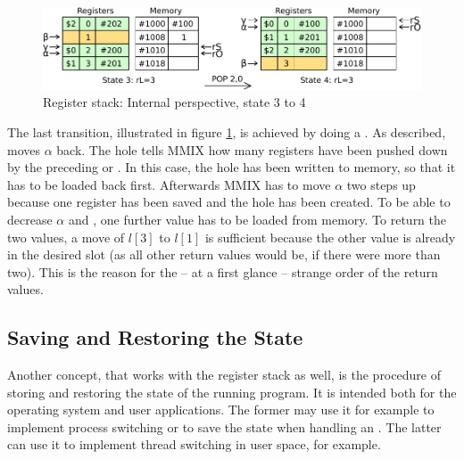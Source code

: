\begin{figure}[H]
	\centering
	\includegraphics[width=\textwidth]{img/push-pop-internal3-crop.pdf}
	\caption{Register stack: Internal perspective, state 3 to 4}
	\label{figure:push-pop-internal3}
\end{figure}
\noindent The last transition, illustrated in figure \ref{figure:push-pop-internal3}, is achieved by doing a . As described,  moves $\alpha$ back. The hole tells MMIX how many registers have been pushed down by the preceding  or . In this case, the hole has been written to memory, so that it has to be loaded back first. Afterwards MMIX has to move $\alpha$ two steps up because one register has been saved and the hole has been created. To be able to decrease $\alpha$ and , one further value has to be loaded from memory. To return the two values, a move of $l[3]$ to $l[1]$ is sufficient because the other value is already in the desired slot (as all other return values would be, if there were more than two). This is the reason for the -- at a first glance -- strange order of the return values.

\subsection{Saving and Restoring the State}

Another concept, that works with the register stack as well, is the procedure of storing and restoring the state of the running program. It is intended both for the operating system and user applications. The former may use it for example to implement process switching or to save the state when handling an . The latter can use it to implement thread switching in user space, for example.

